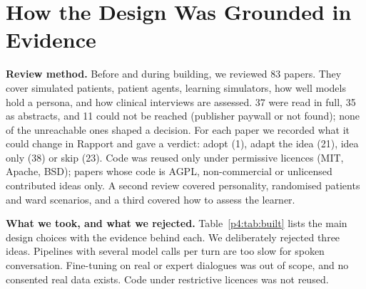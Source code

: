 \documentclass[journal]{IEEEtran}
\begin{document}
\section{How the Design Was Grounded in Evidence}\label{sec:evidence}
\textbf{Review method.} Before and during building, we reviewed 83 papers. They cover simulated patients, patient agents, learning simulators, how well models hold a persona, and how clinical interviews are assessed. 37 were read in full, 35 as abstracts, and 11 could not be reached (publisher paywall or not
found); none of the unreachable ones shaped a decision. For each paper we recorded what it could change in Rapport and gave a verdict: adopt
(1), adapt the idea (21), idea only (38) or skip (23). Code was reused only under permissive licences (MIT, Apache, BSD); papers whose code is
AGPL, non-commercial or unlicensed contributed ideas only. A second review covered personality, randomised patients and ward scenarios, and a
third covered how to assess the learner.

\textbf{What we took, and what we rejected.} Table~\ref{p4:tab:built} lists the main design choices with the evidence behind each. We deliberately rejected three ideas. Pipelines with several model calls per turn are too slow for spoken conversation. Fine-tuning on real or expert dialogues was out of scope, and no consented real data exists. Code under restrictive licences was not reused.
\end{document}
